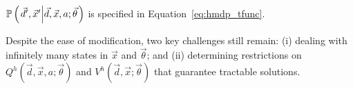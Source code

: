 {\footnotesize $\mathbb{P}\left({\left. \vec{d}', \vec{x}' \middle| \vec{d}, \vec{x}, a; \vec{\theta} \right. }\right)$ } is specified in Equation~\eqref{eq:hmdp_tfunc}. 

Despite the ease of modification, two key challenges still remain: (i) dealing with infinitely many states in {\footnotesize $\vec{x}$} and {\footnotesize $\vec{\theta}$}; and (ii) determining restrictions on {\footnotesize $Q^{h}(\vec{d}, \vec{x}, a; \vec{\theta})$} and {\footnotesize $V^{h}(\vec{d}, \vec{x}; \vec{\theta})$} that guarantee tractable solutions. 
